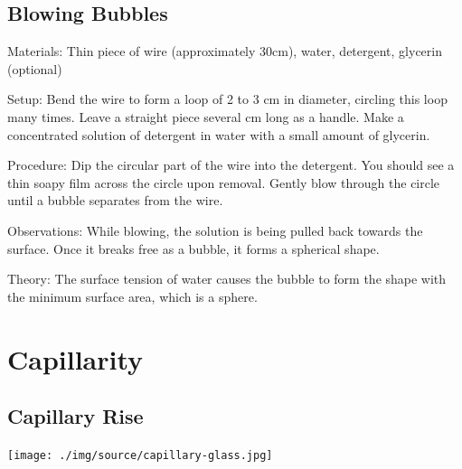\begin{multicols}{2}
\subsection{Blowing Bubbles}
\begin{description*}
\item[Materials:]{Thin piece of wire (approximately 30cm), water, detergent, glycerin (optional)}
\item[Setup:]{Bend the wire to form a loop of 2 to 3 cm in diameter, circling this loop many times. Leave a straight piece several cm long as a handle. Make a concentrated solution of detergent in water with a small amount of glycerin.}
\item[Procedure:]{Dip the circular part of the wire into the detergent. You should see a thin soapy film across the circle upon removal. Gently blow through the circle until a bubble separates from the wire.}
\item[Observations:]{While blowing, the solution is being pulled back towards the surface. Once it breaks free as a bubble, it forms a spherical shape.}
\item[Theory:]{The surface tension of water causes the bubble to form the shape with the minimum surface area, which is a sphere.}
\end{description*}

\columnbreak


\section*{Capillarity}


\subsection{Capillary Rise}

\begin{center}
\texttt{[image: ./img/source/capillary-glass.jpg]}
\end{center}


\end{multicols}
